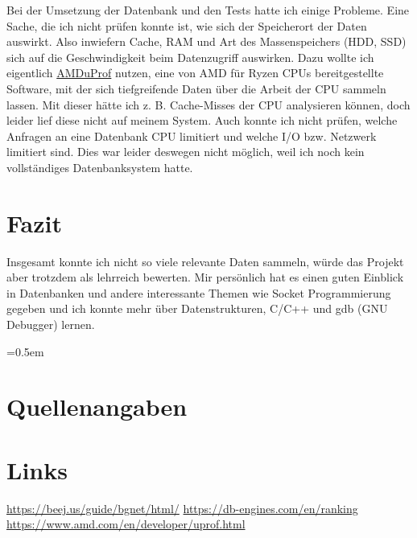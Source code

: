 \documentclass[11pt,a4paper]{article}
\begin{document}
Bei der Umsetzung der Datenbank und den Tests hatte ich einige Probleme.
Eine Sache, die ich nicht prüfen konnte ist, wie sich der Speicherort der Daten
auswirkt. Also inwiefern Cache, RAM und Art des Massenspeichers (HDD, SSD)
sich auf die Geschwindigkeit beim Datenzugriff auswirken.
Dazu wollte ich eigentlich \href{https://www.amd.com/en/developer/uprof.html}{AMDuProf}
nutzen, eine von AMD für Ryzen CPUs bereitgestellte Software, mit der sich tiefgreifende
Daten über die Arbeit der CPU sammeln lassen. Mit dieser hätte ich z. B. Cache-Misses
der CPU analysieren können, doch leider lief diese nicht auf meinem System.
Auch konnte ich nicht prüfen, welche Anfragen an eine Datenbank CPU limitiert
und welche I/O bzw. Netzwerk limitiert sind. Dies war leider deswegen nicht
möglich, weil ich noch kein vollständiges Datenbanksystem hatte.

\section{Fazit}

Insgesamt konnte ich nicht so viele relevante Daten sammeln, würde das Projekt aber
trotzdem als lehrreich bewerten. Mir persönlich hat es einen guten Einblick in
Datenbanken und andere interessante Themen wie Socket Programmierung gegeben
und ich konnte mehr über Datenstrukturen, C/C++ und gdb (GNU Debugger) lernen.

\clearpage

\emergencystretch=0.5em

\section{Quellenangaben}

\section*{Links}

\url{https://beej.us/guide/bgnet/html/}
\url{https://db-engines.com/en/ranking}
\url{https://www.amd.com/en/developer/uprof.html}

\printbibliography[title={Literaturverzeichnis}]
\end{document}
